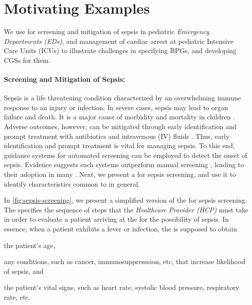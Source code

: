\section{Motivating Examples}

We use \BPGs{} for screening and mitigation of
sepsis in pediatric \textit{Emergency Departments (EDs)}, and management of cardiac arrest
at pediatric Intensive Care Units (ICUs) to illustrate challenges in specifying
BPGs, and developing CGSs for them.

\paragraph{Screening and Mitigation of Sepsis:}

Sepsis is a life threatening condition characterized by an
overwhelming immune response to an injury or infection. In severe cases,
sepsis may lead to organ failure and death. It is
a major cause of morbidity and mortality in children \cite{Eisenberg2021JP}.
Adverse outcomes, however, can be mitigated through early
identification and prompt treatment with antibiotics and
intravenous (IV) fluids \cite{Weiss2014CCM}\cite{Evans2018JAMA}. Thus, early
identification and prompt treatment is vital for managing sepsis. To this end,
guidance systems for automated screening can be employed to detect the onset of
sepsis. Evidence suggests such systems outperform
manual screening \cite{EisenbergAAP21},
leading to their adoption in many \EDs{} \cite{Balamuth2017EM} \cite{Sepanski2014FP}.
Next, we present a \BPG{} for sepsis screening, and use it to identify characteristics
common to \BPGs{} in general.

In \figurename \ref{fig:sepsis-screening}, we present a simplified version of the \BPG{} for
sepsis screening. The \BPG{} specifies the sequence of steps that the \emph{Healthcare
Provider (HCP)} must take in order to evaluate a patient arriving at the \ED{} for
the possibility of sepsis. In essence, when a patient exhibits
a fever or infection, the \HCP{} is supposed to obtain
\begin{enumerate*}[label=(\alph*)]
  \item the patient's age,
  \item any conditions, such as cancer, immunosuppresssion, etc,
    that increase likelihood of sepsis, and
  \item the patient's vital signs, such as heart rate, systolic blood
    pressure, respiratory rate, etc.
\end{enumerate*}


